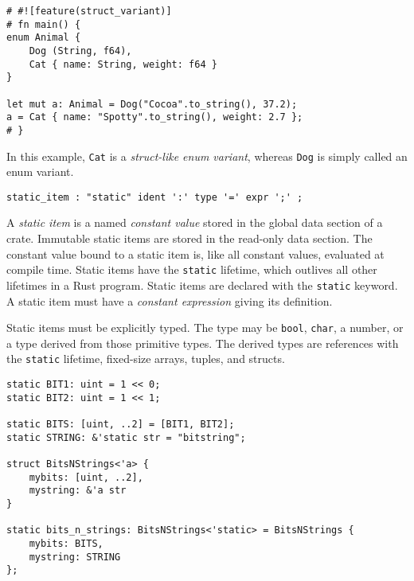 \documentclass[]{article}
\begin{document}
\begin{verbatim}
# #![feature(struct_variant)]
# fn main() {
enum Animal {
    Dog (String, f64),
    Cat { name: String, weight: f64 }
}

let mut a: Animal = Dog("Cocoa".to_string(), 37.2);
a = Cat { name: "Spotty".to_string(), weight: 2.7 };
# }
\end{verbatim}

In this example, \texttt{Cat} is a \emph{struct-like enum variant},
whereas \texttt{Dog} is simply called an enum variant.


\begin{verbatim}
static_item : "static" ident ':' type '=' expr ';' ;
\end{verbatim}

A \emph{static item} is a named \emph{constant value} stored in the
global data section of a crate. Immutable static items are stored in the
read-only data section. The constant value bound to a static item is,
like all constant values, evaluated at compile time. Static items have
the \texttt{static} lifetime, which outlives all other lifetimes in a
Rust program. Static items are declared with the \texttt{static}
keyword. A static item must have a \emph{constant expression} giving its
definition.

Static items must be explicitly typed. The type may be \texttt{bool},
\texttt{char}, a number, or a type derived from those primitive types.
The derived types are references with the \texttt{static} lifetime,
fixed-size arrays, tuples, and structs.

\begin{verbatim}
static BIT1: uint = 1 << 0;
static BIT2: uint = 1 << 1;

static BITS: [uint, ..2] = [BIT1, BIT2];
static STRING: &'static str = "bitstring";

struct BitsNStrings<'a> {
    mybits: [uint, ..2],
    mystring: &'a str
}

static bits_n_strings: BitsNStrings<'static> = BitsNStrings {
    mybits: BITS,
    mystring: STRING
};
\end{verbatim}

\end{document}

